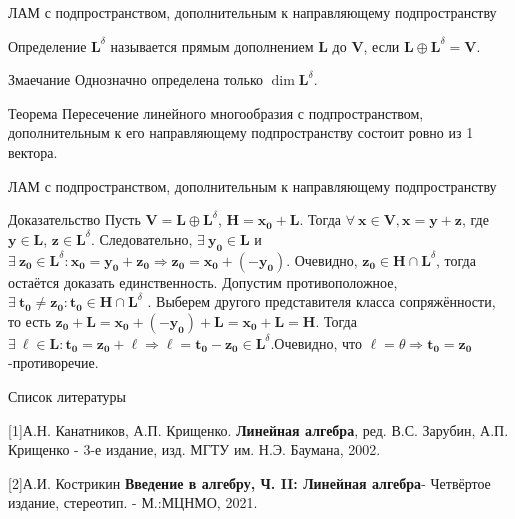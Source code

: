 \documentclass{beamer}
\begin{document}
\begin{frame}{ ЛАМ с подпространством, дополнительным к направляющему подпространству}

\begin{block}{Определение}
    $\mathbf{L}^\delta$ называется прямым дополнением $\mathbf{L}$ до $\mathbf{V}$, если $\mathbf{L}\oplus \mathbf{L}^\delta=\mathbf{V}$.
\end{block}

\begin{block}{Змаечание}
    Однозначно определена только $\dim\mathbf{L}^\delta$.
\end{block}

\begin{block}{Теорема}
 Пересечение линейного многообразия с подпространством, дополнительным к его направляющему подпространству состоит ровно из 1 вектора.   
\end{block}

\end{frame}



\begin{frame}{ ЛАМ с подпространством, дополнительным к направляющему подпространству}
\begin{block}{Доказательство}
    Пусть $\mathbf{V}=\mathbf{L}\oplus \mathbf{L}^\delta$, $\mathbf{H}=\mathbf{x_0}+\mathbf{L}$. Тогда $\forall\:\mathbf{x} \in \mathbf{V},    \mathbf{x}=\mathbf{y}+\mathbf{z}$, где $\mathbf{y}\in\mathbf{L}$, $\mathbf{z}\in\mathbf{L}^\delta$.
    Следовательно, $\exists\:\mathbf{y_0}\in\mathbf{L}$ и $\exists\:\mathbf{z_0}\in\mathbf{L}^\delta:\mathbf{x_0}=\mathbf{y_0}+\mathbf{z_0}\Rightarrow\mathbf{z_0}=\mathbf{x_0}+(-\mathbf{y_0})$. Очевидно, $\mathbf{z_0}\in\mathbf{H}\cap\mathbf{L}^\delta$, тогда остаётся доказать единственность. Допустим противоположное, $\exists\: \mathbf{t_0}\neq\mathbf{z_0}:\mathbf{t_0}\in\mathbf{H}\cap\mathbf{L}^\delta$ . Выберем другого представителя класса сопряжённости, то есть $\mathbf{z_0}+\mathbf{L}=\mathbf{x_0}+(-\mathbf{y_0})+\mathbf{L}=\mathbf{x_0}+\mathbf{L}=\mathbf{H}$.
    Тогда
    $\exists\:\mathbf{\ell }\in\mathbf{L}:\mathbf{t_0}=\mathbf{z_0}+\mathbf{\ell }\Rightarrow \mathbf{\ell}=\mathbf{t_0 }-\mathbf{z_0}\in\mathbf{L}^\delta$.Очевидно, что $\mathbf{\ell }=\theta\Rightarrow\mathbf{t_0}=\mathbf{z_0}$-противоречие.
\end{block}

\end{frame}



\begin{frame}{Список литературы}
  
    [1]А.Н. Канатников, А.П. Крищенко. {\bf Линейная алгебра}, ред. В.С. Зарубин, А.П. Крищенко
    - 3-е издание, изд. МГТУ им. Н.Э. Баумана, 2002.
    
    [2]А.И. Кострикин {\bf Введение в алгебру, Ч. II: Линейная алгебра}- Четвёртое издание, стереотип. - М.:МЦНМО, 2021.
\end{frame}
\end{document}

